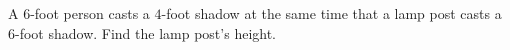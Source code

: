 A $6$-foot person casts a $4$-foot shadow at the same time that a lamp post casts a $6$-foot shadow. Find the lamp post's height.

